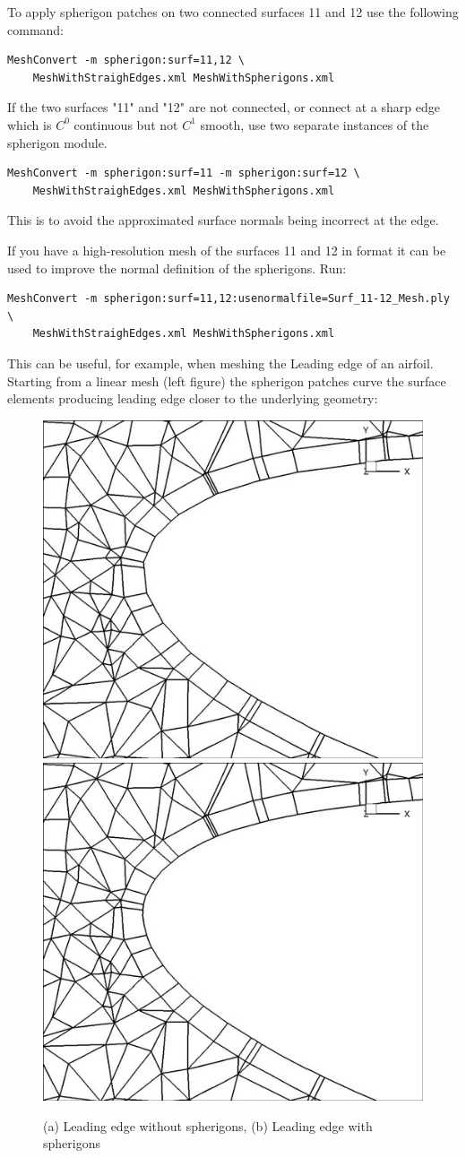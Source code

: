 To apply spherigon patches on two connected surfaces 11 and 12 use the following
command:
%
\begin{lstlisting}[style=BashInputStyle]
MeshConvert -m spherigon:surf=11,12 \
    MeshWithStraighEdges.xml MeshWithSpherigons.xml
\end{lstlisting}
%
If the two surfaces "11" and "12" are not connected, or connect at a sharp edge
which is $C^0$ continuous but not $C^1$ smooth, use two separate instances of
the spherigon module.
%
\begin{lstlisting}[style=BashInputStyle]
MeshConvert -m spherigon:surf=11 -m spherigon:surf=12 \
    MeshWithStraighEdges.xml MeshWithSpherigons.xml
\end{lstlisting}
%
This is to avoid the approximated surface normals being incorrect at the edge.

If you have a high-resolution mesh of the surfaces 11 and 12 in \inltt{ply}
format it can be used to improve the normal definition of the spherigons. Run:
\begin{lstlisting}[style=BashInputStyle]
MeshConvert -m spherigon:surf=11,12:usenormalfile=Surf_11-12_Mesh.ply \
    MeshWithStraighEdges.xml MeshWithSpherigons.xml 
\end{lstlisting}

This can be useful, for example, when meshing the Leading edge of an
airfoil. Starting from a linear mesh (left figure) the spherigon patches curve
the surface elements producing leading edge closer to the underlying geometry:

\begin{figure}[!htbp]
  \begin{center}
    \includegraphics[width = 0.47 \textwidth]{Figures/noSphnoBL.jpg}
    \includegraphics[width = 0.47 \textwidth]{Figures/SphnoBL.jpg}
    \caption{(a) Leading edge without spherigons, (b) Leading edge with
      spherigons}
  \end{center}
\end{figure}

